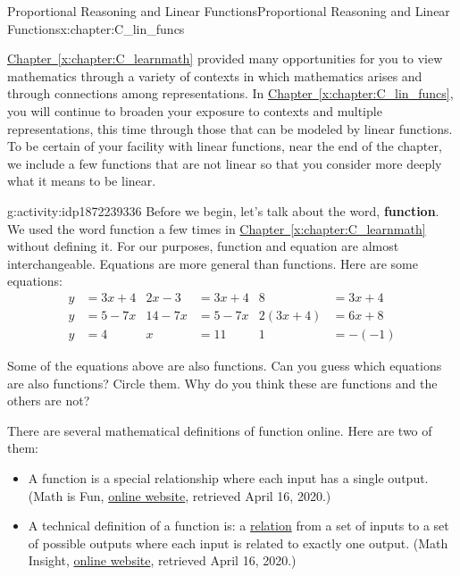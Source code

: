 \documentclass[oneside,10pt,]{book}
\newcommand{\xreffont}{\relax}
\newcommand{\terminology}[1]{\textbf{#1}}
\numberwithin{equation}{chapter}
\newcommand{\amp}{&}
\begin{document}
\typeout{************************************************}
%
\begin{chapterptx}{Proportional Reasoning and Linear Functions}{}{Proportional Reasoning and Linear Functions}{}{}{x:chapter:C_lin_funcs}
\begin{introduction}{}%
\hyperref[x:chapter:C_learnmath]{Chapter~{\xreffont\ref{x:chapter:C_learnmath}}} provided many opportunities for you to view mathematics through a variety of contexts in which mathematics arises and through connections among representations. In \hyperref[x:chapter:C_lin_funcs]{Chapter~{\xreffont\ref{x:chapter:C_lin_funcs}}}, you will continue to broaden your exposure to contexts and multiple representations, this time through those that can be modeled by linear functions. To be certain of your facility with linear functions, near the end of the chapter, we include a few functions that are not linear so that you consider more deeply what it means to be linear.%
\begin{activity}{}{g:activity:idp1872239336}%
Before we begin, let's talk about the word, \terminology{function}. We used the word function a few times in \hyperref[x:chapter:C_learnmath]{Chapter~{\xreffont\ref{x:chapter:C_learnmath}}} without defining it. For our purposes, function and equation are almost interchangeable. Equations are more general than functions. Here are some equations:%
\begin{align*}
y \amp = 3x + 4 \amp 2x - 3 \amp = 3x + 4 \amp 8 \amp = 3x + 4\\
y \amp = 5 - 7x \amp 14 - 7x \amp = 5 - 7x \amp 2(3x + 4) \amp = 6x + 8\\
y \amp = 4 \amp x \amp = 11 \amp 1 \amp = - (-1)
\end{align*}
%
\par
Some of the equations above are also functions. Can you guess which equations are also functions? Circle them. Why do you think these are functions and the others are not?%
\par
There are several mathematical definitions of function online. Here are two of them:%
\begin{itemize}[label=\textbullet]
\item{}A function is a special relationship where each input has a single output. (Math is Fun, \href{https://www.mathsisfun.com/definitions/function.html}{online website}\footnotemark{}, retrieved April 16, 2020.)%
\item{}A technical definition of a function is: a \href{http://mathinsight.org/definition/relation}{relation}\footnotemark{} from a set of inputs to a set of possible outputs where each input is related to exactly one output. (Math Insight, \href{http://mathinsight.org/definition/function}{online website}\footnotemark{}, retrieved April 16, 2020.)%

\end{itemize}
\end{activity}
\end{introduction}
\end{chapterptx}
\end{document}
